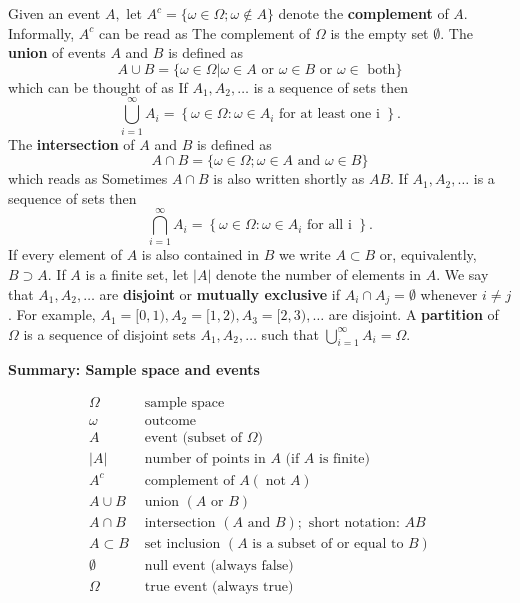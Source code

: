 \documentclass[
  14pt,
]{memoir}
\begin{document}
Given an event \(A,\) let \(A^{c}=\{\omega \in \Omega ; \omega \notin A\}\) denote the \textbf{complement} of \(A\). Informally, \(A^{c}\) can be read as  The complement of \(\Omega\) is the empty set \(\emptyset\). The \textbf{union} of events \(A\) and \(B\) is defined as
\[
A\cup B=\{\omega \in \Omega|\omega\in A\text{ or }\omega \in B\text{ or }\omega\in\text{ both}\}
\]
which can be thought of as  If \(A_{1}, A_{2}, \ldots\) is a sequence of sets then
\[
\bigcup_{i=1}^{\infty} A_{i}=\left\{\omega \in \Omega: \omega \in A_{i} \text { for at least one i }\right\}.
\]
The \textbf{intersection} of \(A\) and \(B\) is defined as
\[
A \cap B=\{\omega \in \Omega ; \omega \in A\text{ and }\omega \in B\}\]
which reads as  Sometimes \(A \cap B\) is also written shortly as \(AB\). If \(A_{1}, A_{2}, \ldots\) is a sequence of sets then
\[
\bigcap_{i=1}^{\infty} A_{i}=\left\{\omega \in \Omega: \omega \in A_{i} \text { for all i }\right\}.
\]
If every element of \(A\) is also contained in \(B\) we write \(A \subset B\) or, equivalently, \(B \supset A\). If \(A\) is a finite set, let \(|A|\) denote the number of elements in \(A .\) We say that \(A_{1}, A_{2}, \ldots\) are \textbf{disjoint} or \textbf{mutually exclusive} if \(A_{i} \cap A_{j}=\emptyset\) whenever \(i \neq j\). For example, \(A_{1}=[0,1), A_{2}=[1,2), A_{3}=[2,3), \ldots\) are disjoint. A \textbf{partition} of \(\Omega\) is a sequence of disjoint sets \(A_{1}, A_{2}, \ldots\) such that \(\bigcup_{i=1}^{\infty} A_{i}=\Omega\).

\noindent\textbf{Summary: Sample space and events}
\vspace*{-1cm}

\begin{center}
$$
\begin{array}{ll}
\Omega & \text { sample space } \\
\omega & \text { outcome }\\
A      & \text { event (subset of } \Omega) \\
|A|    & \text { number of points in } A \text { (if } A \text { is finite) }\\
A^{c}  & \text { complement of } A (\operatorname{not} A)\\
A \cup B &\text{ union }(A\text{ or }B)\\
A \cap B &\text{ intersection }(A \text { and } B);\text{ short notation: }AB\\
A \subset B &\text{ set inclusion }(A \text{ is a subset of or equal to }B)\\
\emptyset   &\text{ null event (always false)}\\
\Omega      &\text{ true event (always true)}
\end{array}
$$
\end{center}
\end{document}

